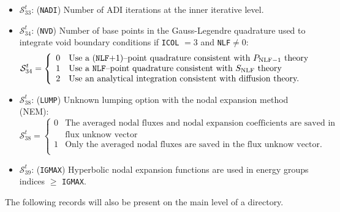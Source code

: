 \begin{itemize}
\item $\mathcal{S}^{t}_{33}$: ({\tt NADI}) Number of ADI iterations at the inner
iterative level.

\item $\mathcal{S}^{t}_{34}$: ({\tt NVD}) Number of base points in the Gauss-Legendre quadrature used to integrate
void boundary conditions if {\tt ICOL} $=3$ and {\tt NLF}$\ne 0$:
\begin{displaymath}
\mathcal{S}^{t}_{34} = \left\{
\begin{array}{rl}
 0 & \textrm{Use a ({\tt NLF}$+1$)--point quadrature consistent with $P_{{\rm NLF}-1}$ theory} \\
 1 & \textrm{Use a {\tt NLF}--point quadrature consistent with $S_{\rm NLF}$ theory} \\
 2 & \textrm{Use an analytical integration consistent with diffusion theory.}
\end{array} \right.
\end{displaymath}

\item $\mathcal{S}^{t}_{38}$: ({\tt LUMP}) Unknown lumping option with the nodal expansion method (NEM):
\begin{displaymath}
\mathcal{S}^{t}_{38} = \left\{
\begin{array}{rl}
 0 & \textrm{The averaged nodal fluxes and nodal expansion coefficients are saved in the} \\
   & \textrm{flux unknow vector} \\
 1 & \textrm{Only the averaged nodal fluxes are saved in the flux unknow vector.} \\
\end{array} \right.
\end{displaymath}

\item $\mathcal{S}^{t}_{39}$: ({\tt IGMAX}) Hyperbolic nodal expansion functions are used in energy groups indices $\ge$ {\tt IGMAX}.

\end{itemize}

The following records will also be present on the main level of a 
directory.

